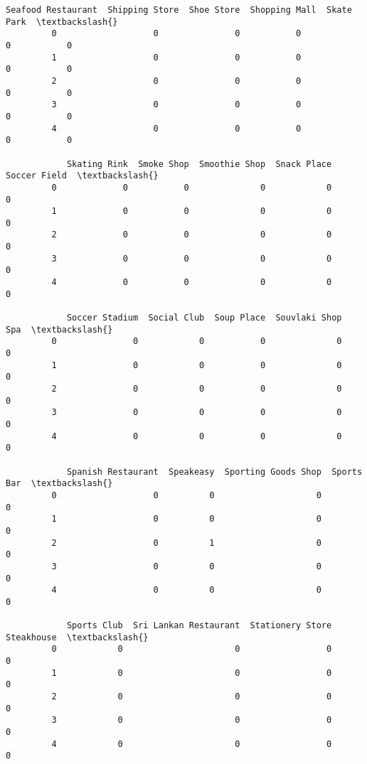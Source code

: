 \documentclass[11pt]{article}
\begin{document}
\begin{Verbatim}[commandchars=\\\{\}]
            Seafood Restaurant  Shipping Store  Shoe Store  Shopping Mall  Skate Park  \textbackslash{}
         0                   0               0           0              0           0   
         1                   0               0           0              0           0   
         2                   0               0           0              0           0   
         3                   0               0           0              0           0   
         4                   0               0           0              0           0   
         
            Skating Rink  Smoke Shop  Smoothie Shop  Snack Place  Soccer Field  \textbackslash{}
         0             0           0              0            0             0   
         1             0           0              0            0             0   
         2             0           0              0            0             0   
         3             0           0              0            0             0   
         4             0           0              0            0             0   
         
            Soccer Stadium  Social Club  Soup Place  Souvlaki Shop  Spa  \textbackslash{}
         0               0            0           0              0    0   
         1               0            0           0              0    0   
         2               0            0           0              0    0   
         3               0            0           0              0    0   
         4               0            0           0              0    0   
         
            Spanish Restaurant  Speakeasy  Sporting Goods Shop  Sports Bar  \textbackslash{}
         0                   0          0                    0           0   
         1                   0          0                    0           0   
         2                   0          1                    0           0   
         3                   0          0                    0           0   
         4                   0          0                    0           0   
         
            Sports Club  Sri Lankan Restaurant  Stationery Store  Steakhouse  \textbackslash{}
         0            0                      0                 0           0   
         1            0                      0                 0           0   
         2            0                      0                 0           0   
         3            0                      0                 0           0   
         4            0                      0                 0           0   
         

\end{Verbatim}
\end{document}
